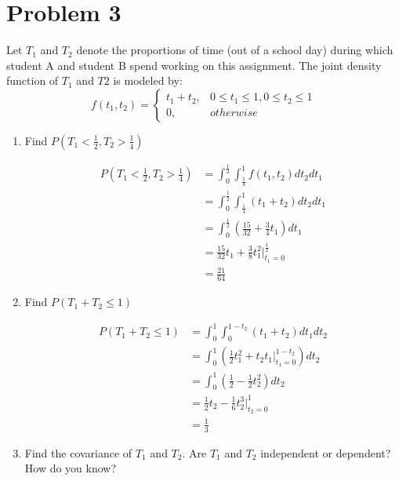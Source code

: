 \documentclass[11pt]{article}
\begin{document}
\newpage

\section*{Problem 3}
Let $T_1$ and $T_2$ denote the proportions of time (out of a school day) during which student A and student B spend working on this assignment. The joint density function of $T_1$ and $T2$ is modeled by:
\[
  f(t_1, t_2) =
  \begin{cases}
    t_1 + t_2, & 0\leq t_1 \leq 1, 0\leq t_2\leq 1\\
    0, & otherwise
  \end{cases}
\]

\begin{enumerate}
  \item Find $P(T_1< \frac{1}{2},T_2 > \frac{1}{4})$
  \begin{solution}
    $ $\\
    \begin{align*}
        P(T_1< \frac{1}{2},T_2 > \frac{1}{4}) &= \int_{0}^{\frac{1}{2}} \int_{\frac{1}{4}}^{1} f(t_1, t_2) dt_2 dt_1 \\
        &=  \int_{0}^{\frac{1}{2}} \int_{\frac{1}{4}}^{1} (t_1 + t_2) dt_2 dt_1 \\
        &=  \int_{0}^{\frac{1}{2}} (\frac{15}{32} + \frac{3}{4}t_1) dt_1 \\
        &= \frac{15}{32}t_1 + \frac{3}{8}t_1^2 \big|_{t_1 = 0}^{\frac{1}{2}}\\
        &= \frac{21}{64}
    \end{align*}
  \end{solution}
  \item  Find $P(T_1 + T_2 \leq 1)$
  \begin{solution}
    $ $\\
    \begin{align*}
      P(T_1 + T_2 \leq 1) &= \int_{0}^{1} \int_{0}^{1-t_2} (t_1 + t_2) dt_1 dt_2 \\
      &= \int_{0}^{1} (\frac{1}{2} t_1^2 + t_2t_1 \big|_{t_1 = 0}^{1-t_2}) dt_2 \\
      &=  \int_{0}^{1} (\frac{1}{2} - \frac{1}{2}t_2^2) dt_2 \\
      &= \frac{1}{2}t_2 - \frac{1}{6}t_2^3 \big|_{t_2 = 0}^{1} \\
      &= \frac{1}{3}
    \end{align*}
  \end{solution}
  \item  Find the covariance of $T_1$ and $T_2$. Are $T_1$ and $T_2$ independent or dependent? How do you know?

\end{enumerate}
\end{document}
